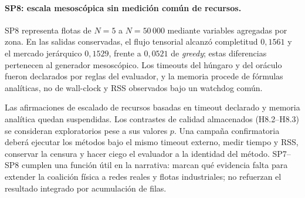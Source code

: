 \paragraph{SP8: escala mesoscópica sin medición común de recursos.}
SP8 representa flotas de $N=5$ a $N=50\,000$ mediante variables agregadas por zona. En las salidas conservadas, el flujo tensorial alcanzó completitud $0{,}1561$ y el mercado jerárquico $0{,}1529$, frente a $0{,}0521$ de \emph{greedy}; estas diferencias pertenecen al generador mesoscópico. Los timeouts del húngaro y del oráculo fueron declarados por reglas del evaluador, y la memoria procede de fórmulas analíticas, no de wall-clock y RSS observados bajo un watchdog común.

Las afirmaciones de escalado de recursos basadas en timeout declarado y memoria analítica quedan suspendidas. Los contrastes de calidad almacenados (H8.2--H8.3) se consideran exploratorios pese a sus valores $p$. Una campaña confirmatoria deberá ejecutar los métodos bajo el mismo timeout externo, medir tiempo y RSS, conservar la censura y hacer ciego el evaluador a la identidad del método. SP7--SP8 cumplen una función útil en la narrativa: marcan qué evidencia falta para extender la coalición física a redes reales y flotas industriales; no refuerzan el resultado integrado por acumulación de filas.

